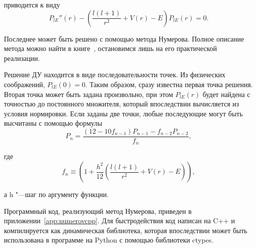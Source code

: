 приводится к виду
\begin{equation}
  P_{l E}''(r)
  - \left(\frac{l \left(l + 1 \right)}{r^2} + V(r) - E\right) P_{l E}(r) = 0.
\end{equation}

Последнее может быть решено с помощью метода Нумерова. Полное описание метода можно найти в
книге~\cite{numerov}, остановимся лишь на его практической реализации.

Решение ДУ находится в виде последовательности точек. Из физических соображений, $P_{l E}(0) = 0$. Таким образом,
сразу известна первая точка решения. Вторая точка может быть задана произвольно, при этом $P_{l E}(r)$
будет найдена с точностью до постоянного множителя, который впоследствии вычисляется из условия нормировки. Если
заданы две точки, любые последующие могут быть высчитаны\cite{numerov-short} с помощью формулы
\begin{equation}
  P_{n} = \frac{(12-10f_{n-1}) P_{n-1}-f_{n-2}P_{n-2}}{f_{n}},
\end{equation}

где
\begin{equation}
f_n \equiv \left( 1 + \frac{h^2}{12}\left({\frac{l \left(l + 1 \right)}{r^2} + V(r) - E} \right) \right),
\end{equation}

а h "---шаг по аргументу функции.

Программный код, реализующий метод Нумерова, приведен в приложении~\cref{app:numerovcpp}. Для быстродействия код
написан на C++
и компилируется как динамическая библиотека, которая впоследствии может быть использована в программе на Python с
помощью библиотеки ctypes\cite{ctypes}.

